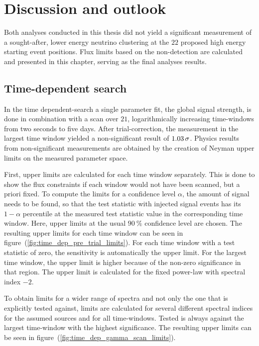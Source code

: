 \chapter{Discussion and outlook}

Both analyses conducted in this thesis did not yield a significant measurement of a sought-after, lower energy neutrino clustering at the $\num{22}$ proposed high energy starting event positions.
Flux limits based on the non-detection are calculated and presented in this chapter, serving as the final analyses results.

\section*{Time-dependent search}
In the time dependent-search a single parameter fit, the global signal strength, is done in combination with a scan over $\num{21}$, logarithmically increasing time-windows from two seconds to five days.
After trial-correction, the measurement in the largest time window yielded a non-significant result of $\num{1.03}\,\sigma$.
Physics results from non-significant measurements are obtained by the creation of Neyman upper limits on the measured parameter space.

First, upper limits are calculated for each time window separately.
This is done to show the flux constraints if each window would not have been scanned, but a priori fixed.
To compute the limits for a confidence level $\alpha$, the amount of signal needs to be found, so that the test statistic with injected signal events has its $1-\alpha$ percentile at the measured test statistic value in the corresponding time window.
Here, upper limits at the usual $\SI{90}{\percent}$ confidence level are chosen.
The resulting upper limits for each time window can be seen in figure~(\ref{fig:time_dep_pre_trial_limits}).
For each time window with a test statistic of zero, the sensitivity is automatically the upper limit.
For the largest time window, the upper limit is higher because of the non-zero significance in that region.
The upper limit is calculated for the fixed power-law with spectral index $-2$.

To obtain limits for a wider range of spectra and not only the one that is explicitly tested against, limits are calculated for several different spectral indices for the assumed sources and for all time-windows.
Tested is always against the largest time-window with the highest significance.
The resulting upper limits can be seen in figure~(\ref{fig:time_dep_gamma_scan_limits}).

